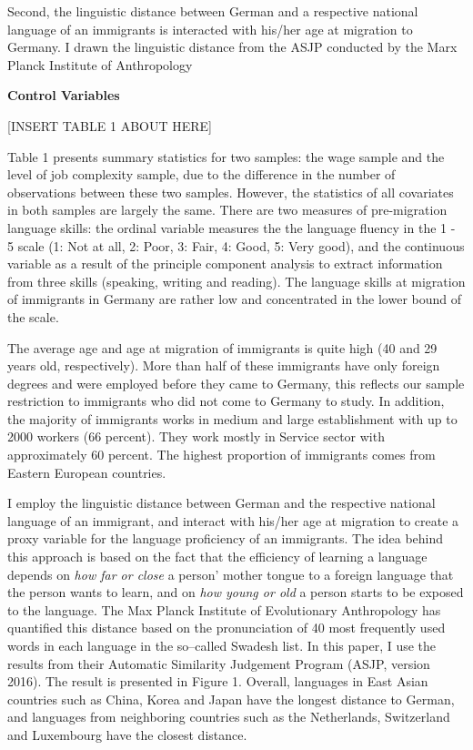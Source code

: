 \documentclass[12pt,a4paper]{article}
\begin{document}
Second, the linguistic distance between German and a respective national language of an immigrants is interacted with his/her age at migration to Germany. I drawn the linguistic distance from the ASJP conducted by the Marx Planck Institute of Anthropology

\begin{flushleft}
\textbf{Control Variables} 
\end{flushleft}

\begin{center}
[INSERT TABLE 1 ABOUT HERE]
\end{center}

Table 1 presents summary statistics for two samples: the wage sample and the level of job complexity sample, due to the difference in the number of observations between these two samples. However, the statistics of all covariates in both samples are largely the same.  There are two measures of pre-migration language skills: the ordinal variable measures the the language fluency in the 1 - 5 scale (1: Not at all, 2: Poor, 3: Fair, 4: Good, 5: Very good), and the continuous variable as a result of the principle component analysis to extract information from three skills (speaking, writing and reading). The language skills at migration of immigrants in Germany are rather low and concentrated in the lower bound of the scale.

The average age and age at migration of immigrants is quite high (40 and 29 years old, respectively). More than half of these immigrants have only foreign degrees and were employed before they came to Germany, this reflects our sample restriction to immigrants who did not come to Germany to study. In addition, the majority of immigrants works in medium and large establishment with up to 2000 workers (66 percent). They work mostly in Service sector with approximately 60 percent. The highest proportion of immigrants comes from Eastern European countries.

I employ the linguistic distance between German and the respective national language of an immigrant, and interact with his/her age at migration to create a proxy variable for the language proficiency of an immigrants. The idea behind this approach is based on the fact that the efficiency of learning a language depends on \textit{how far or close} a person' mother tongue to a foreign language that the person wants to learn, and on \textit{how young or old} a person starts to be exposed to the language. The Max Planck Institute of Evolutionary Anthropology has quantified this distance based on the pronunciation of 40 most frequently used words in each language in the so--called Swadesh list. In this paper, I use the results from their Automatic Similarity Judgement Program (ASJP, version 2016). The result is presented in Figure 1. Overall, languages in East Asian countries such as China, Korea and Japan have the longest distance to German, and languages from neighboring countries such as the Netherlands, Switzerland and Luxembourg have the closest distance.
\end{document}
